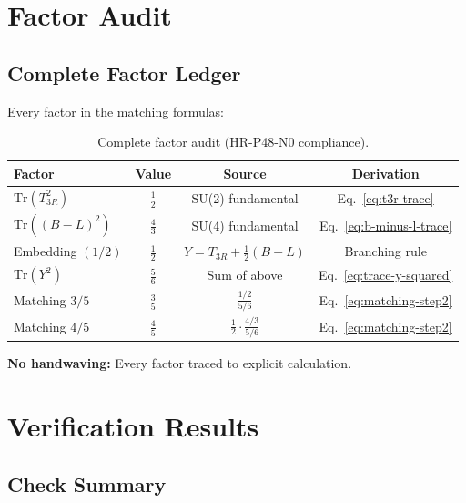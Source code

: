 \documentclass[11pt,a4paper]{article}
\begin{document}
\section{Factor Audit}
\label{sec:factor-audit}

\subsection{Complete Factor Ledger}
\label{subsec:factor-ledger}

Every factor in the matching formulas:

\begin{table}[ht]
\centering
\caption{Complete factor audit (HR-P48-N0 compliance).}
\label{tab:factor-audit}
\begin{tabular}{lccc}
\toprule
Factor & Value & Source & Derivation \\
\midrule
$\mathrm{Tr}(T_{3R}^2)$ & $\frac{1}{2}$ & SU(2) fundamental & Eq.~\eqref{eq:t3r-trace} \\
$\mathrm{Tr}((B-L)^2)$ & $\frac{4}{3}$ & SU(4) fundamental & Eq.~\eqref{eq:b-minus-l-trace} \\
Embedding $(1/2)$ & $\frac{1}{2}$ & $Y = T_{3R} + \frac{1}{2}(B-L)$ & Branching rule \\
$\mathrm{Tr}(Y^2)$ & $\frac{5}{6}$ & Sum of above & Eq.~\eqref{eq:trace-y-squared} \\
Matching $3/5$ & $\frac{3}{5}$ & $\frac{1/2}{5/6}$ & Eq.~\eqref{eq:matching-step2} \\
Matching $4/5$ & $\frac{4}{5}$ & $\frac{1}{2} \cdot \frac{4/3}{5/6}$ & Eq.~\eqref{eq:matching-step2} \\
\bottomrule
\end{tabular}
\end{table}

\textbf{No handwaving:} Every factor traced to explicit calculation.

\section{Verification Results}
\label{sec:verification}

\subsection{Check Summary}
\label{subsec:check-summary}
\end{document}
